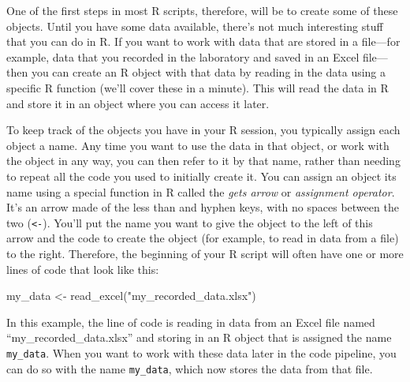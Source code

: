 \documentclass[]{tufte-book}
\newenvironment{Shaded}{}{}
\newcommand{\FunctionTok}[1]{\textcolor[rgb]{0.02,0.16,0.49}{#1}}
\newcommand{\NormalTok}[1]{#1}
\newcommand{\OtherTok}[1]{\textcolor[rgb]{0.00,0.44,0.13}{#1}}
\newcommand{\StringTok}[1]{\textcolor[rgb]{0.25,0.44,0.63}{#1}}
\begin{document}
One of the first steps in most R scripts, therefore, will be to create some of
these objects. Until you have some data available, there's not much interesting
stuff that you can do in R. If you want to work with data that are stored in a
file---for example, data that you recorded in the laboratory and saved in an
Excel file---then you can create an R object with that data by reading in the
data using a specific R function (we'll cover these in a minute). This will read
the data in R and store it in an object where you can access it later.

To keep track of the objects you have in your R session, you typically assign
each object a name. Any time you want to use the data in that object, or work
with the object in any way, you can then refer to it by that name, rather than
needing to repeat all the code you used to initially create it. You can assign
an object its name using a special function in R called the \emph{gets arrow} or
\emph{assignment operator}. It's an arrow made of the less than and hyphen keys, with
no spaces between the two (\texttt{\textless{}-}). You'll put the name you want to give the object
to the left of this arrow and the code to create the object (for example, to read
in data from a file) to the right. Therefore, the beginning of your R script
will often have one or more lines of code that look like this:

\begin{Shaded}
\begin{Highlighting}[]
\NormalTok{my\_data }\OtherTok{\textless{}{-}} \FunctionTok{read\_excel}\NormalTok{(}\StringTok{"my\_recorded\_data.xlsx"}\NormalTok{)}
\end{Highlighting}
\end{Shaded}

In this example, the line of code is reading in data from an Excel file named
``my\_recorded\_data.xlsx'' and storing in an R object that is assigned the name
\texttt{my\_data}. When you want to work with these data later in the code pipeline, you
can do so with the name \texttt{my\_data}, which now stores the data from that file.
\end{document}
